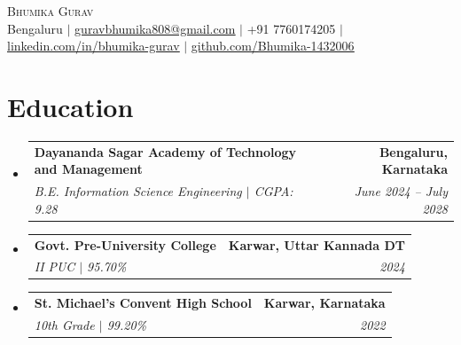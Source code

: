 \documentclass[letterpaper,10pt]{article}
\makeatletter
\newcommand{\resumeSubheading}[4]{
  \vspace{-2pt}\item
    \begin{tabular*}{1.0\textwidth}[t]{l@{\extracolsep{\fill}}r}
      \textbf{#1} & \textbf{\small #2} \\
      \textit{\small#3} & \textit{\small #4} \\
    \end{tabular*}\vspace{-7pt}
}
\newcommand{\resumeSubHeadingListStart}{\begin{itemize}[leftmargin=0.0in, label={}]}
\newcommand{\resumeSubHeadingListEnd}{\end{itemize}}
\makeatother
\begin{document}
\begin{center}
    {\Huge \scshape Bhumika Gurav} \\ \vspace{1pt}
    \small
    Bengaluru $|$
    \href{mailto:guravbhumika808@gmail.com}{\underline{guravbhumika808@gmail.com}} $|$
    +91 7760174205 $|$
    \href{https://linkedin.com/in/bhumika-gurav-54b61b3a4}{\underline{linkedin.com/in/bhumika-gurav}} $|$
    \href{https://github.com/Bhumika-1432006}{\underline{github.com/Bhumika-1432006}}
    \vspace{-8pt}
\end{center}


\section{Education}
  \resumeSubHeadingListStart
    \resumeSubheading
      {Dayananda Sagar Academy of Technology and Management}{Bengaluru, Karnataka}
      {B.E. Information Science Engineering $|$ CGPA: 9.28}{June 2024 -- July 2028}
    \resumeSubheading
      {Govt. Pre-University College}{Karwar, Uttar Kannada DT}
      {II PUC $|$ 95.70\%}{2024}
    \resumeSubheading
      {St. Michael's Convent High School}{Karwar, Karnataka}
      {10th Grade $|$ 99.20\%}{2022}
  \resumeSubHeadingListEnd
  \vspace{-4pt}


\end{document}
